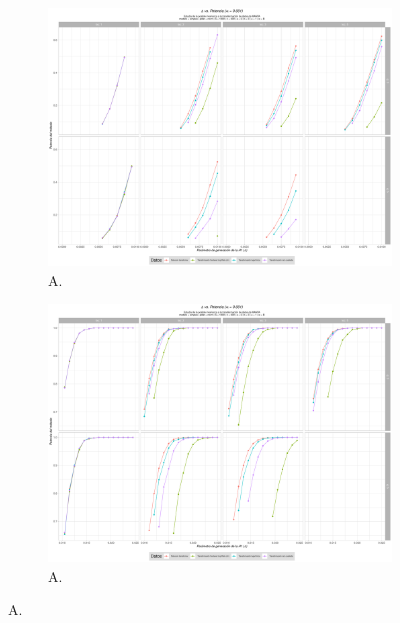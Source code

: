\documentclass[IB,BIB]{TFUOC}%
\begin{document}
\begin{figure}[!htbp]
\hspace*{-2cm} %
\begin{subfigure}{.65\textwidth}
  \centering
  \includegraphics[width=.7\linewidth]{OBJ2SimplexMANTAqloc0001ColaIzq.pdf}
  \caption{\scriptsize{A.}}
  \label{figAppend:OBJ2SimplexMANTAqloc0001ColaIzq}
\end{subfigure}%
\begin{subfigure}{.65\textwidth}
\hspace*{-2.3cm} %
  \centering
  \includegraphics[width=.7\linewidth]{OBJ2SimplexMANTAqloc0001Coladch.pdf}
  \caption{\scriptsize{A.}}
  \label{figAppend:OBJ2SimplexMANTAqloc0001Coladch}
\end{subfigure}
\caption{\scriptsize{A.}}
\label{figAppend:OBJ20001zoom}
\end{figure}



\end{document}
